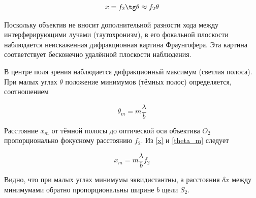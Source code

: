 \documentclass[a4paper, 12pt]{article}%
\begin{document}
	 \begin{equation}\label{x}
	 	x = f_2 \tg \theta \approx f_2 \theta
	 \end{equation}
	 
	 Поскольку объектив не вносит дополнительной разности хода
	 между интерферирующими лучами (таутохронизм), в его фокальной
	 плоскости наблюдается неискаженная дифракционная картина Фраунгофера. Эта картина соответствует бесконечно удалённой плоскости
	 наблюдения.
	 
	 В центре поля зрения наблюдается дифракционный максимум (светлая полоса). При малых углах $ \theta $ положение минимумов (тёмных полос)
	 определяется, соотношением
	 
	 \begin{equation}\label{theta_m}
	 	\theta_m = m \dfrac{\lambda}{b}
	 \end{equation}
	 
	 Расстояние $ x_m $ от тёмной полосы до оптической оси объектива $ O_2 $ пропорционально фокусному расстоянию $ f_2 $. Из \eqref{x} и \eqref{theta_m} следует 
	 
	 \begin{equation}\label{xm}
	 	x_m = m \dfrac{\lambda}{b} f_2
	 \end{equation}
	 
	 Видно, что при малых углах минимумы эквидистантны, а расстояния $ \delta x $ между минимумами обратно пропорциональны ширине $ b $ щели $ S_2 $.
	 
\end{document}
